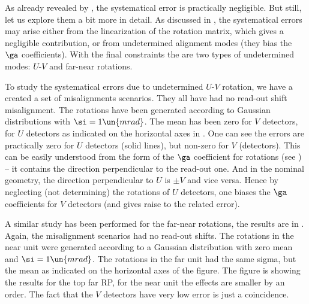 
As already revealed by , the systematical error is practically negligible. But still, let us explore them a bit more in detail. As discussed in , the systematical errors may arise either from the linearization of the rotation matrix, which gives a negligible contribution, or from undetermined alignment modes (they bias the $\ga$ coefficients). With the final constraints the are two types of undetermined modes: $U$-$V$ and far-near rotations. 

To study the systematical errors due to undetermined $U$-$V$ rotation, we have a created a set of misalignments scenarios. They all have had no read-out shift misalignment. The rotations have been generated according to Gaussian distributions with $\si = 1\un{mrad}$. The mean has been zero for $V$ detectors, for $U$ detectors as indicated on the horizontal axes in . One can see the errors are practically zero for $U$ detectors (solid lines), but non-zero for $V$ (detectors). This can be easily understood from the form of the $\ga$ coefficient for rotations (see ) -- it contains the direction perpendicular to the read-out one. And in the nominal geometry, the direction perpendicular to $U$ is $\pm V$ and vice versa. Hence by neglecting (not determining) the rotations of $U$ detectors, one biases the $\ga$ coefficients for $V$ detectors (and gives raise to the related error).


A similar study has been performed for the far-near rotations, the results are in . Again, the misalignment scenarios had no read-out shifts. The rotations in the near unit were generated according to a Gaussian distribution with zero mean and $\si=1\un{mrad}$. The rotations in the far unit had the same sigma, but the mean as indicated on the horizontal axes of the figure. The figure is showing the results for the top far RP, for the near unit the effects are smaller by an order. The fact that the $V$ detectors have very low error is just a coincidence.

